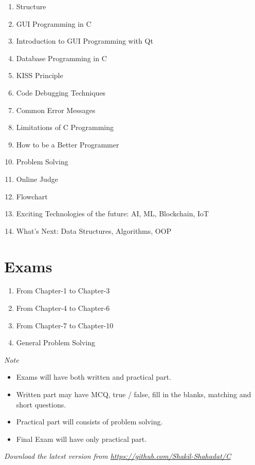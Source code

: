 \documentclass[a4paper,11pt]{article}
\begin{document}
	\begin{enumerate}
		\item Structure
		\item GUI Programming in C
		\item Introduction to GUI Programming with Qt
		\item Database Programming in C
		\item KISS Principle
		\item Code Debugging Techniques
		\item Common Error Messages
		\item Limitations of C Programming
		\item How to be a Better Programmer
		\item Problem Solving
		\item Online Judge
		\item Flowchart
		\item Exciting Technologies of the future: AI, ML, Blockchain, IoT
		\item What’s Next: Data Structures, Algorithms, OOP
	\end{enumerate}


	\section*{ Exams }

	\begin{enumerate}
		\item From Chapter-1 to Chapter-3
		\item From Chapter-4 to Chapter-6
		\item From Chapter-7 to Chapter-10
		\item General Problem Solving
	\end{enumerate}


	\em Note

	\begin{itemize}
		\item Exams will have both written and practical part.
		\item Written part may have MCQ, true / false, fill in the blanks, matching and short questions.
		\item Practical part will consists of problem solving.
		\item Final Exam will have only practical part.
	\end{itemize}
	
	\em \large Download the latest version from \url{https://github.com/Shakil-Shahadat/C}
\end{document}
